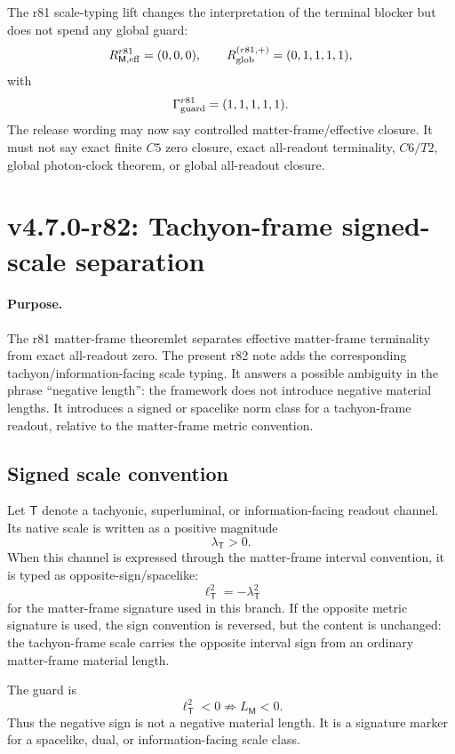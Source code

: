 The r81 scale-typing lift changes the interpretation of the terminal blocker but does not
spend any global guard:
\[
R_{\mathsf M,\rm eff}^{r81}=(0,0,0),
\qquad
R_{\rm glob}^{(r81,+)}=(0,1,1,1,1),
\]
with
\[
\Gamma_{\rm guard}^{r81}=(1,1,1,1,1).
\]
The release wording may now say controlled matter-frame/effective closure.  It must not
say exact finite \(C5\) zero closure, exact all-readout terminality, \(C6/T2\), global
photon-clock theorem, or global all-readout closure.


\section*{v4.7.0-r82: Tachyon-frame signed-scale separation}
\label{sec:r82-tachyon-frame-signed-scale}

\paragraph{Purpose.}
The r81 matter-frame theoremlet separates effective matter-frame terminality from exact
all-readout zero.  The present r82 note adds the corresponding tachyon/information-facing
scale typing.  It answers a possible ambiguity in the phrase ``negative length'': the
framework does not introduce negative material lengths.  It introduces a signed or
spacelike norm class for a tachyon-frame readout, relative to the matter-frame metric
convention.

\subsection*{Signed scale convention}
\label{subsec:r82-signed-scale-convention}

Let \(\mathsf T\) denote a tachyonic, superluminal, or information-facing readout channel.
Its native scale is written as a positive magnitude
\[
\lambda_{\mathsf T}>0.
\]
When this channel is expressed through the matter-frame interval convention, it is typed as
opposite-sign/spacelike:
\[
\ell_{\mathsf T}^{2}=-\lambda_{\mathsf T}^{2}
\]
for the matter-frame signature used in this branch.  If the opposite metric signature is
used, the sign convention is reversed, but the content is unchanged: the tachyon-frame
scale carries the opposite interval sign from an ordinary matter-frame material length.

The guard is
\[
\ell_{\mathsf T}^{2}<0
\not\Rightarrow
L_{\mathsf M}<0.
\]
Thus the negative sign is not a negative material length.  It is a signature marker for a
spacelike, dual, or information-facing scale class.

